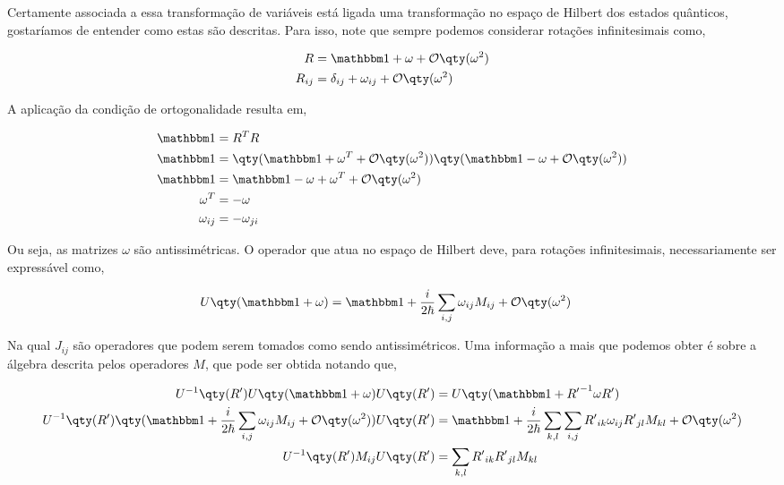 \documentclass[twoside]{amsart}
\numberwithin{equation}{section}
\begin{document}
\begin{refsection}
Certamente associada a essa transformação de variáveis está ligada uma transformação no espaço de Hilbert dos estados quânticos, gostaríamos de entender como estas são descritas. Para isso, note que sempre podemos considerar rotações infinitesimais como,

\begin{align}
    R&=\mathbbm 1+\omega+\mathcal O\qty(\omega^2)\nonumber\\
    R_{ij}&=\delta_{ij}+\omega_{ij}+\mathcal O\qty(\omega ^2)
\end{align}

A aplicação da condição de ortogonalidade resulta em,

\begin{align}
    \mathbbm 1&=R^TR\nonumber\\
    \mathbbm 1&=\qty(\mathbbm 1+\omega^T+\mathcal O\qty(\omega^2))\qty(\mathbbm 1-\omega+\mathcal O\qty(\omega^2))\nonumber\\
    \mathbbm 1&=\mathbbm 1-\omega +\omega^T+\mathcal O\qty(\omega^2)\nonumber\\
    \omega^T&=-\omega\nonumber\\
    \omega_{ij}&=-\omega_{ji}
\end{align}

Ou seja, as matrizes $\omega$ são antissimétricas. O operador que atua no espaço de Hilbert deve, para rotações infinitesimais, necessariamente ser expressável como,

\begin{align}
    U\qty(\mathbbm 1+\omega)&=\mathbbm 1+\frac{i}{2\hbar}\sum\limits_{i,j}\omega_{ij}M_{ij}+\mathcal O \qty(\omega^2)
\end{align}

Na qual $J_{ij}$ são operadores que podem serem tomados como sendo antissimétricos. Uma informação a mais que podemos obter é sobre a álgebra descrita pelos operadores $M$, que pode ser obtida notando que,

\begin{align}
    U^{-1}\qty(R')U\qty(\mathbbm 1+\omega)U\qty(R')&=U\qty(\mathbbm 1+{R'}^{-1}\omega R')\nonumber\\
    U^{-1}\qty(R')\qty(\mathbbm 1+\frac{i}{2\hbar}\sum\limits_{i,j}\omega_{ij}M_{ij}+\mathcal O \qty(\omega^2))U\qty(R')&=\mathbbm 1+\frac{i}{2\hbar}\sum\limits_{k,l}\sum\limits_{i,j}{R'}_{ik}\omega_{ij}{R'}_{jl}M_{kl}+\mathcal O\qty(\omega^2)\nonumber\\
    U^{-1}\qty(R')M_{ij}U\qty(R')&=\sum\limits_{k,l}{R'}_{ik}{R'}_{jl}M_{kl}
\end{align}

\printbibliography[heading=subbibliography]
\end{refsection}

\end{document}
